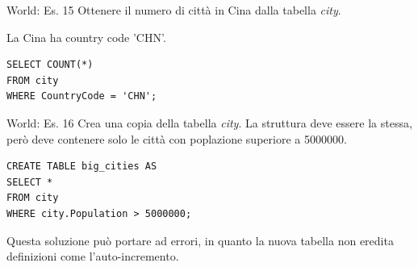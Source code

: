 \begin{frame}[fragile]{World: Es. 15}
Ottenere il numero di citt\`a in Cina dalla tabella \textit{city}.

La Cina ha country code 'CHN'.
\pause
\begin{lstlisting}
SELECT COUNT(*)
FROM city
WHERE CountryCode = 'CHN';
\end{lstlisting}
\end{frame}
%

\begin{frame}[fragile]{World: Es. 16}
Crea una copia della tabella \textit{city}.
La struttura deve essere la stessa, per\`o deve contenere solo le citt\`a con poplazione superiore a 5000000.
\pause
\begin{lstlisting}
CREATE TABLE big_cities AS 
SELECT *
FROM city
WHERE city.Population > 5000000;
\end{lstlisting}
Questa soluzione pu\`o portare ad errori, in quanto la nuova tabella non eredita definizioni come l'auto-incremento.
\end{frame}


